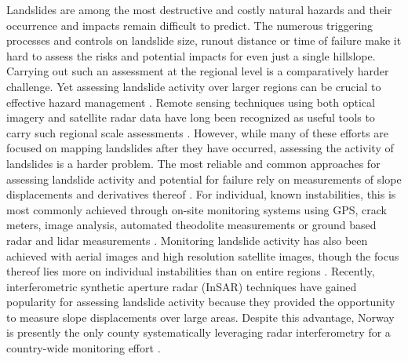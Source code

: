 \documentclass[nhess, manuscript]{copernicus}
\begin{document}
\introduction  %
Landslides are among the most destructive and costly natural hazards and their occurrence and impacts remain difficult to predict. The numerous triggering processes and controls on landslide size, runout distance or time of failure make it hard to assess the risks and potential impacts for even just a single hillslope. Carrying out such an assessment at the regional level is a comparatively harder challenge. Yet assessing landslide activity over larger regions can be crucial to effective hazard management \citep{vanwesten2006}. Remote sensing techniques using both optical imagery and satellite radar data have long been recognized as useful tools to carry such regional scale assessments \citep{mantovani1996, rosin2005}. However, while many of these efforts are focused on mapping landslides after they have occurred, assessing the activity of landslides is a harder problem.
The most reliable and common approaches for assessing landslide activity and potential for failure rely on measurements of slope displacements and derivatives thereof \citep{intrieri2019}. For individual, known instabilities, this is most commonly achieved through on-site monitoring systems using GPS, crack meters, image analysis, automated theodolite measurements or ground based radar and lidar measurements \citep[e.g.,][]{gili2000, chelli2006, kos2016, loew2016}. Monitoring landslide activity has also been achieved with aerial images and high resolution satellite images, though the focus thereof lies more on individual instabilities than on entire regions \citep[e.g.,][]{hervas2003}. Recently, interferometric synthetic aperture radar (InSAR) techniques have gained popularity for assessing landslide activity because they provided the opportunity to measure slope displacements over large areas. Despite this advantage, Norway is presently the only county systematically leveraging radar interferometry for a country-wide monitoring effort \citep{lauknes2010, dehls2014}.   \par 
\end{document}
